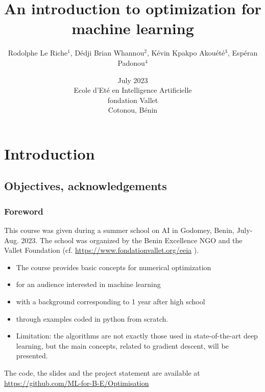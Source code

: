\documentclass[12pt]{beamer}
\begin{document}
\title
[~Optimization for machine learning
]
{An introduction to optimization for machine learning}
\author
[Le Riche et al.]
{\large Rodolphe Le Riche$^1$, Dédji Brian Whannou$^2$, Kévin Kpakpo Akouété$^3$, Espéran Padonou$^4$} 
\date[July 2023]{July 2023 \\
Ecole d'Eté en Intelligence Artificielle \\
fondation Vallet\\
Cotonou, Bénin} 
\begin{frame}
\titlepage
\end{frame}

\section{Introduction}
\subsection{Objectives, acknowledgements}

\begin{frame}
\frametitle{Foreword}
This course was given during a summer school on AI in Godomey, Benin, July-Aug. 2023.
The school was organized by the Benin Excellence NGO and the Vallet Foundation (cf. 
{\scriptsize
\url{https://www.fondationvallet.org/eeia}}
).
\begin{itemize}
\item The course provides basic concepts for numerical optimization
\item for an audience interested in machine learning
\item with a background corresponding to 1 year after high school
\item through examples coded in python from scratch.
\item Limitation: the algorithms are not exactly those used in state-of-the-art deep learning, but the main concepts, related to gradient descent, will be presented.
\end{itemize}
The code, the slides and the project statement are available at {\scriptsize \url{https://github.com/ML-for-B-E/Optimisation}}
\end{frame}
\end{document}

